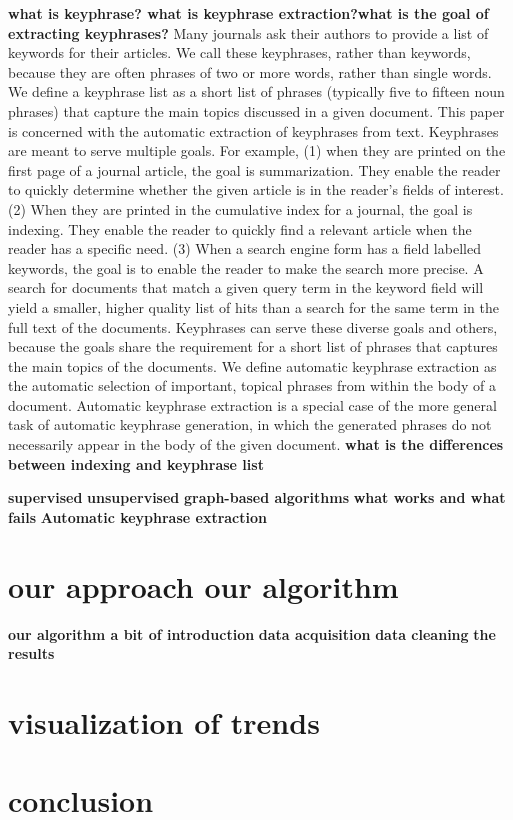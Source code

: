 \textbf{what is keyphrase? what is keyphrase extraction?what is the goal of extracting keyphrases?}
Many journals ask their authors to provide a list of keywords for their articles. We call these keyphrases, rather than keywords, because they are often phrases of two or more words, rather than single words. We define a keyphrase list as a short list of phrases (typically five to fifteen noun phrases) that capture the main topics discussed in a given document. This paper is concerned with the automatic extraction of keyphrases from text.
Keyphrases are meant to serve multiple goals. For example, (1) when they are printed on the first page of a journal article, the goal is summarization. They enable the reader to quickly determine whether the given article is in the reader’s fields of interest. (2) When they are printed in the cumulative index for a journal, the goal is indexing. They enable the reader to quickly find a relevant article when the reader has a specific need. (3) When a search engine form has a field labelled keywords, the goal is to enable the reader to make the search more precise. A search for documents that match a given query term in the keyword field will yield a smaller, higher quality list of hits than a search for the same term in the full text of the documents. Keyphrases can serve these diverse goals and others, because the goals share the requirement for a short list of phrases that captures the main topics of the documents.
We define automatic keyphrase extraction as the automatic selection of important, topical phrases from within the body of a document. Automatic keyphrase extraction is a special case of the more general task of automatic keyphrase generation, in which the generated phrases do not necessarily appear in the body of the given document. 
\textbf{what is the differences between indexing and keyphrase list}

\textbf{supervised} \newline
\textbf{unsupervised}\newline
\textbf{graph-based algorithms}\newline
\textbf{what works and what fails}\newline
\textbf {Automatic keyphrase extraction}
\section{our approach our algorithm}
\textbf{our algorithm a bit of introduction}\newline
\textbf{data acquisition}\newline
\textbf{data cleaning}\newline
\textbf{the results}\newline

\section{visualization of trends}

\section{conclusion}


